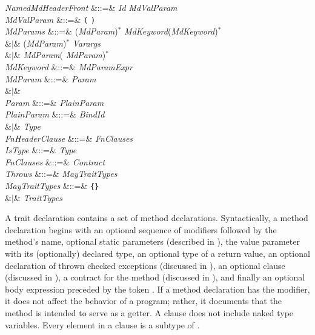 \begin{Grammar}
\emph{NamedMdHeaderFront} &::=&
\emph{Id}  \emph{MdValParam} \\

\emph{MdValParam} &::=& \texttt(  \texttt) \\

\emph{MdParams}
&::=&
(\emph{MdParam}\EXP{,})$^*$  \emph{MdKeyword}(\EXP{,}\emph{MdKeyword})$^*$\\
&$|$&
(\emph{MdParam}\EXP{,})$^*$  \emph{Varargs}\\
&$|$& \emph{MdParam}(\EXP{,} \emph{MdParam})$^*$\\

\emph{MdKeyword} &::=& \emph{MdParam}\EXP{=}\emph{Expr} \\

\emph{MdParam} &::=& \emph{Param} \\
&$|$&  \\

\emph{Param} &::=& \emph{PlainParam}\\

\emph{PlainParam} &::=& \emph{BindId}  \\
&$|$& \emph{Type} \\

\emph{FnHeaderClause} &::=&  \emph{FnClauses} \\

\emph{IsType} &::=& \EXP{\mathrel{\mathtt{:}}} \emph{Type}\\

\emph{FnClauses} &::=&   \emph{Contract} \\

\emph{Throws} &::=&  \emph{MayTraitTypes}\\

\emph{MayTraitTypes} &::=& \texttt{\{\}} \\
&$|$& \emph{TraitTypes} \\

\end{Grammar}

A trait declaration contains a set of method declarations.
Syntactically, a method declaration begins with
an optional sequence of modifiers followed by
the method's name,
optional static parameters
(described in ),
the value parameter with its (optionally) declared type,
an optional type of a return value,
an optional declaration of thrown checked exceptions
(discussed in ),
an optional  clause
(discussed in ),
a contract for the method (discussed in ),
and finally an optional body expression preceded by the token \EXP{=}.
If a method declaration has the  modifier,
it does not affect the behavior of a program; rather,
it documents that the method is intended to serve as a getter.
A  clause does not include naked type variables.
Every element in a  clause is a subtype of
.


